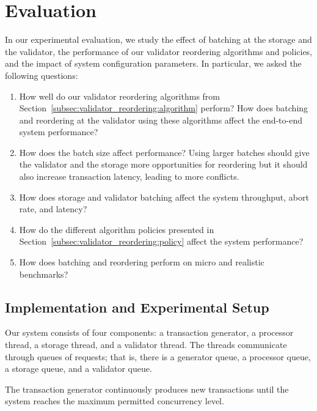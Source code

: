 \section{Evaluation}\label{sec:experiments}
In our experimental evaluation, we study the effect of batching at the storage and the validator, the performance of our validator reordering algorithms and policies, and the impact of system configuration parameters. In particular, we asked the following questions:
\begin{enumerate}
\item\vspace{-.5em} How well do our validator reordering algorithms from Section~\ref{subsec:validator_reordering:algorithm} perform? How does batching and reordering at the validator using these algorithms affect the end-to-end system performance?
\item\vspace{-.5em} How does the batch size affect performance? Using larger batches should give the validator and the storage more opportunities for reordering but it should also increase transaction latency, leading to more conflicts. 
\item\vspace{-.5em} How does storage and validator batching affect the system throughput, abort rate, and latency?
\item\vspace{-.5em} How do the different algorithm policies presented in Section~\ref{subsec:validator_reordering:policy} affect the system performance?
\item\vspace{-.5em} How does batching and reordering perform on micro and realistic benchmarks?
\end{enumerate}

\subsection{Implementation and Experimental Setup}
\label{subsec:experiment:implementation}

Our system consists of four components: a transaction generator, a processor thread, a storage thread, and a validator thread. The threads communicate through queues of requests; that is, there is a generator queue, a processor queue, a storage queue, and a validator queue.

The transaction generator continuously produces new transactions until the system reaches the maximum permitted concurrency level. 

